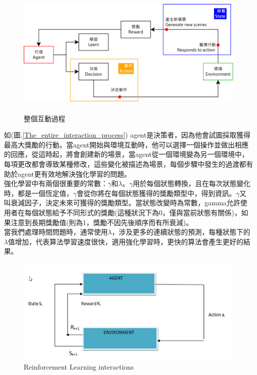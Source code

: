 \documentclass[14pt,a4paper]{report}  %
\begin{document}
\begin{figure}[hbt!]
\begin{center}
\includegraphics[height=6.3cm]{The_entire_interaction_process}
\caption{\Large 整個互動過程 }
\label{整個互動過程 }
\end{center}
\end{figure}
 如(圖.\ref{The_entire_interaction_process}) agent是決策者，因為他會試圖採取獲得最高大獎勵的行動。當agent開始與環境互動時，他可以選擇一個操作並做出相應的回應，從這時起，將會創建新的場景，當agent從一個環境變為另一個環境中，每項更改都會導致某種修改，這些變化被描述為場景，每個步驟中發生的過渡都有助於agent更有效地解決強化學習的問題。\\
 強化學習中有兩個很重要的常數：$\gamma$和$\lambda$。$\gamma$用於每個狀態轉換，且在每次狀態變化時，都是一個恆定值，$\gamma$會從你將在每個狀態獲得的獎勵類型中，得到資訊。$\gamma$又叫衰減因子，決定未來可獲得的獎勵類型。當狀態改變時為常數，gamma允許使用者在每個狀態給予不同形式的獎勵(這種狀況下為0，僅與當前狀態有關係)，如果注意到長期獎勵值(則為1，獎勵不因先後順序而有所衰減)。\\
 當我們處理時間問題時，通常使用$\lambda$，涉及更多的連續狀態的預測，每種狀態下的$\lambda$值增加，代表算法學習速度很快，適用強化學習時，更快的算法會產生更好的結果。\\
\iffalse
\begin{figure}[hbt!]
\begin{center}
\includegraphics[scale=0.74]{ Reinforcement_Learning_interactions}
\caption{\Large Reinforcement Learning interactions}
\end{center}
\end{figure}
\end{document}
